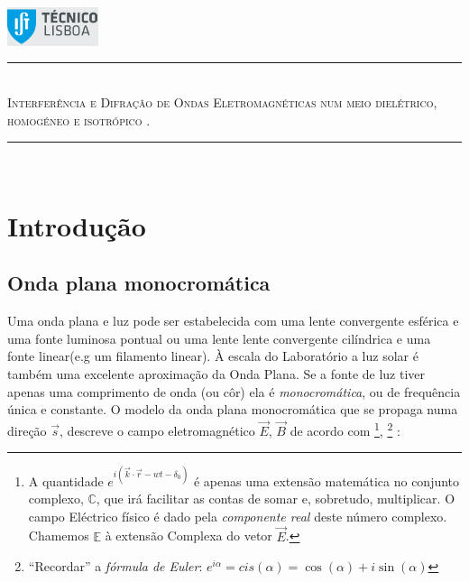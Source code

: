 \documentclass[a4paper,12pt]{article}
\author{Prof. Bernardo B. Carvalho}
\date{ Outubro 2012}
\newcommand{\HRule}{\rule{\linewidth}{0.5mm}}
\begin{document}
 

	\includegraphics[width=0.2\textwidth]{../logo-ist}%

	\HRule \\[0.5cm]
	{ \huge \sf  \textsc{Interferência e Difração de Ondas Eletromagnéticas num meio dielétrico, homogéneo e isotrópico .}} \\[0.4cm] %
	\HRule \\%





\section{\sf Introdução}
\subsection{\sf Onda plana monocromática }

Uma onda plana e luz pode ser estabelecida com uma lente convergente esférica e uma fonte luminosa pontual ou uma lente lente convergente cilíndrica 
e uma fonte linear(e.g um filamento linear).  À escala do Laboratório a luz solar é também uma excelente aproximação da Onda Plana.
Se a fonte de luz tiver apenas uma comprimento de onda (ou côr) ela é \emph{monocromática}, ou de frequência única e constante.
O modelo da onda plana monocromática que se propaga numa direção $\vec{s}$, descreve o campo  eletromagnético $\vec{E}$, $\vec{B}$ de acordo com
\footnote{A quantidade $e^{ i (\vec{k} \cdot \vec{r} -wt - \delta_0)}$ é apenas uma extensão matemática no conjunto complexo, $\mathbb{C}$,  que irá facilitar as contas de somar e, sobretudo, multiplicar. O campo Eléctrico físico é dado pela \emph{componente real} deste número complexo. Chamemos $\mathbb{E}$ à extensão Complexa do vetor  $\vec{E}$.}, 
\footnote{``Recordar''  a \emph{fórmula de Euler}: $e^{i \alpha} = cis(\alpha) = \cos(\alpha) + i \sin(\alpha)$} :
\end{document}
